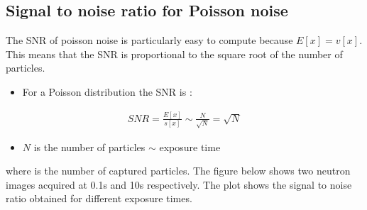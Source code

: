 \documentclass[letterpaper,10pt,english]{sphinxmanual}
\begin{document}
\subsection{Signal to noise ratio for Poisson noise}
\label{\detokenize{02-ImageEnhancement:signal-to-noise-ratio-for-poisson-noise}}
\sphinxAtStartPar
The SNR of poisson noise is particularly easy to compute because \(E[x]=v[x]\). This means that the SNR is proportional to the square root of the number of particles.
\begin{itemize}
\item {} 
\sphinxAtStartPar
For a Poisson distribution the SNR is :

\end{itemize}
\begin{equation*}
\begin{split}SNR=\frac{E[x]}{s[x]}\sim\frac{N}{\sqrt{N}}=\sqrt{N}\end{split}
\end{equation*}\begin{itemize}
\item {} 
\sphinxAtStartPar
\(N\) is the number of particles \(\sim\) exposure time

\end{itemize}

\sphinxAtStartPar
where  is the number of captured particles. The figure below shows two neutron images acquired at 0.1s and 10s respectively. The plot shows the signal to noise ratio obtained for different exposure times.
\end{document}
